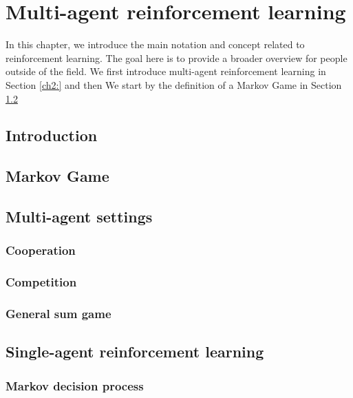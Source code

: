 \chapter{Multi-agent reinforcement learning} \label{ch:marl}

\begin{chapter_outline}

In this chapter, we introduce the main notation and concept related to reinforcement learning.
The goal here is to provide a broader overview for people outside of the field.
We first introduce multi-agent reinforcement learning in Section \ref{ch2:} and then
We start by the definition of a Markov Game in Section \ref{ch2:sec:Markov Game}


\end{chapter_outline}


\section{Introduction} \label{ch2:sec:Introduction}
\section{Markov Game} \label{ch2:sec:Markov Game}
\section{Multi-agent settings} \label{ch2:sec:Multi-agent settings}
\subsection{Cooperation} \label{ch2:sec:Cooperation}
\subsection{Competition} \label{ch2:sec:Competition}
\subsection{General sum game} \label{ch2:sec:General sum game}
\section{Single-agent reinforcement learning} \label{ch2:sec:Single-agent RL}
\subsection{Markov decision process} \label{ch2:sec:MDP}

